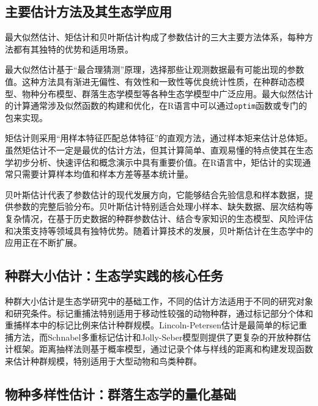 \documentclass[
  twoside,12pt,fontset=none]{ctexbook}
\begin{document}
\hypertarget{ux4e3bux8981ux4f30ux8ba1ux65b9ux6cd5ux53caux5176ux751fux6001ux5b66ux5e94ux7528}{%
\subsection{主要估计方法及其生态学应用}\label{ux4e3bux8981ux4f30ux8ba1ux65b9ux6cd5ux53caux5176ux751fux6001ux5b66ux5e94ux7528}}

最大似然估计、矩估计和贝叶斯估计构成了参数估计的三大主要方法体系，每种方法都有其独特的优势和适用场景。

最大似然估计基于``最合理猜测''原理，选择那些让观测数据最有可能出现的参数值。这种方法具有渐进无偏性、有效性和一致性等优良统计性质，在种群动态模型、物种分布模型、群落生态学模型等各种生态学模型中广泛应用。最大似然估计的计算通常涉及似然函数的构建和优化，在R语言中可以通过\texttt{optim}函数或专门的包来实现。

矩估计则采用``用样本特征匹配总体特征''的直观方法，通过样本矩来估计总体矩。虽然矩估计不一定是最优的估计方法，但其计算简单、直观易懂的特点使其在生态学初步分析、快速评估和概念演示中具有重要价值。在R语言中，矩估计的实现通常只需要计算样本均值和样本方差等基本统计量。

贝叶斯估计代表了参数估计的现代发展方向，它能够结合先验信息和样本数据，提供参数的完整后验分布。贝叶斯估计特别适合处理小样本、缺失数据、层次结构等复杂情况，在基于历史数据的种群参数估计、结合专家知识的生态模型、风险评估和决策支持等领域具有独特优势。随着计算技术的发展，贝叶斯估计在生态学中的应用正在不断扩展。

\hypertarget{ux79cdux7fa4ux5927ux5c0fux4f30ux8ba1ux751fux6001ux5b66ux5b9eux8df5ux7684ux6838ux5fc3ux4efbux52a1}{%
\subsection{种群大小估计：生态学实践的核心任务}\label{ux79cdux7fa4ux5927ux5c0fux4f30ux8ba1ux751fux6001ux5b66ux5b9eux8df5ux7684ux6838ux5fc3ux4efbux52a1}}

种群大小估计是生态学研究中的基础工作，不同的估计方法适用于不同的研究对象和研究条件。标记重捕法特别适用于移动性较强的动物种群，通过标记部分个体和重捕样本中的标记比例来估计种群规模。Lincoln-Petersen估计是最简单的标记重捕方法，而Schnabel多重标记估计和Jolly-Seber模型则提供了更复杂的开放种群估计框架。距离抽样法则基于概率模型，通过记录个体与样线的距离和构建发现函数来估计种群规模，特别适用于大型动物和鸟类种群。

\hypertarget{ux7269ux79cdux591aux6837ux6027ux4f30ux8ba1ux7fa4ux843dux751fux6001ux5b66ux7684ux91cfux5316ux57faux7840}{%
\subsection{物种多样性估计：群落生态学的量化基础}\label{ux7269ux79cdux591aux6837ux6027ux4f30ux8ba1ux7fa4ux843dux751fux6001ux5b66ux7684ux91cfux5316ux57faux7840}}
\end{document}
